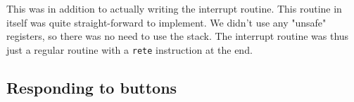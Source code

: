 This was in addition to actually writing the interrupt routine. This
routine in itself was quite straight-forward to implement. We didn't use
any "unsafe" registers, so there was no need to use the stack. The
interrupt routine was thus just a regular routine with a \texttt{rete}
instruction at the end.

\subsection{Responding to buttons}




